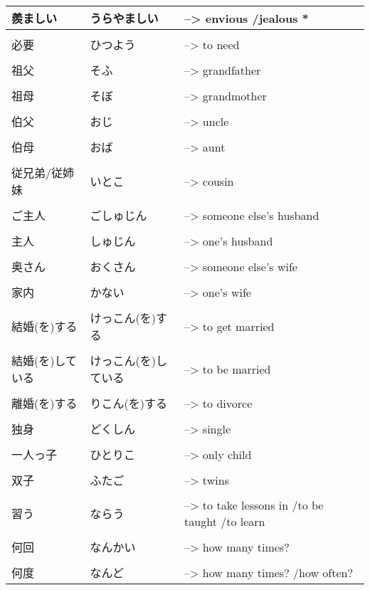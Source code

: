 \documentclass{article}
\begin{document}
\begin{tabular}{ p{3cm} | l l }
羨ましい    &うらやましい       &--> envious /jealous * \\ \hline\\[-1em]
必要&ひつよう&--> to need \\ \hline\\[-1em]
祖父&そふ&--> grandfather \\ \hline\\[-1em]
祖母&そぼ&--> grandmother \\ \hline\\[-1em]
伯父&おじ&--> uncle \\ \hline\\[-1em]
伯母&おば&--> aunt \\ \hline\\[-1em]
従兄弟/従姉妹&いとこ&--> cousin \\ \hline\\[-1em]
ご主人&ごしゅじん&--> someone else's husband \\ \hline\\[-1em]
主人&しゅじん&--> one's husband \\ \hline\\[-1em]
奥さん&おくさん&--> someone else's wife \\ \hline\\[-1em]
家内&かない&--> one's wife \\ \hline\\[-1em]
結婚(を)する&けっこん(を)する&--> to get married \\ \hline\\[-1em]
結婚(を)している&けっこん(を)している&--> to be married \\ \hline\\[-1em]
離婚(を)する&りこん(を)する&--> to divorce \\ \hline\\[-1em]
独身&どくしん&--> single \\ \hline\\[-1em] 
一人っ子&ひとりこ&--> only child \\ \hline\\[-1em]
双子&ふたご&--> twins \\ \hline\\[-1em]
習う&ならう&--> to take lessons in /to be taught /to learn \\ \hline\\[-1em]
何回&なんかい&--> how many times? \\ \hline\\[-1em]
何度&なんど&--> how many times? /how often? %
\end{tabular}
\end{document}
